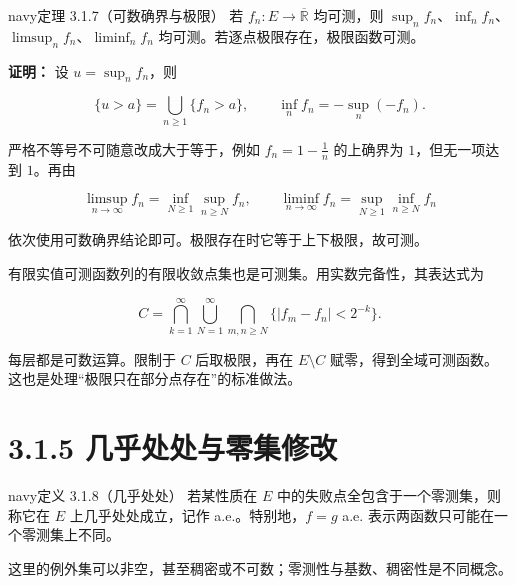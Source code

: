 \documentclass[11pt,a4paper]{article}
\begin{document}
\begin{sboxenv}{navy}{定理 3.1.7（可数确界与极限）}
若 \(f_n:E\to\overline{\mathbb R}\) 均可测，则
\(\sup_n f_n\)、\(\inf_n f_n\)、\(\limsup_n f_n\)、\(\liminf_n f_n\)
均可测。若逐点极限存在，极限函数可测。

\end{sboxenv}

\textbf{证明：} 设 \(u=\sup_n f_n\)，则

\begin{equation*}
\{u>a\}=\bigcup_{n\ge1}\{f_n>a\},\qquad
\inf_n f_n=-\sup_n(-f_n).
\tag{3.1.4}
\end{equation*}

严格不等号不可随意改成大于等于，例如 \(f_n=1-\frac1n\) 的上确界为
\(1\)，但无一项达到 \(1\)。再由

\begin{equation*}
\limsup_{n\to\infty}f_n=\inf_{N\ge1}\sup_{n\ge N}f_n,\qquad
\liminf_{n\to\infty}f_n=\sup_{N\ge1}\inf_{n\ge N}f_n
\tag{3.1.5}
\end{equation*}

依次使用可数确界结论即可。极限存在时它等于上下极限，故可测。

有限实值可测函数列的有限收敛点集也是可测集。用实数完备性，其表达式为

\begin{equation*}
C=\bigcap_{k=1}^{\infty}\bigcup_{N=1}^{\infty}
\bigcap_{m,n\ge N}\{|f_m-f_n|<2^{-k}\}.
\tag{3.1.6}
\end{equation*}

每层都是可数运算。限制于 \(C\) 后取极限，再在 \(E\setminus C\)
赋零，得到全域可测函数。这也是处理``极限只在部分点存在''的标准做法。

\section[\S{}3.1.5
几乎处处与零集修改]{3.1.5
几乎处处与零集修改}\label{ux51e0ux4e4eux5904ux5904ux4e0eux96f6ux96c6ux4feeux6539}

\begin{sboxenv}{navy}{定义 3.1.8（几乎处处）}
若某性质在 \(E\) 中的失败点全包含于一个零测集，则称它在 \(E\)
上几乎处处成立，记作 a.e.。特别地，\(f=g\) a.e.
表示两函数只可能在一个零测集上不同。

\end{sboxenv}

这里的例外集可以非空，甚至稠密或不可数；零测性与基数、稠密性是不同概念。
\end{document}
